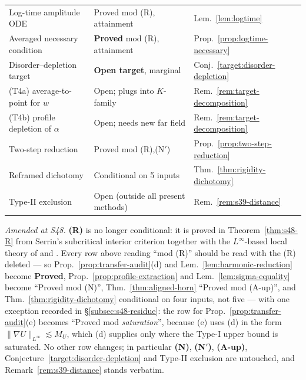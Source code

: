 \documentclass[11pt]{article}
\theoremstyle{definition}
\theoremstyle{remark}
\begin{document}
\begin{center}
\begin{tabular}{lll}
Log-time amplitude ODE & Proved mod (R), attainment & Lem.~\ref{lem:logtime} \\
Averaged necessary condition & \textbf{Proved} mod (R), attainment & Prop.~\ref{prop:logtime-necessary} \\
Disorder--depletion target & \textbf{Open target}, marginal & Conj.~\ref{target:disorder-depletion} \\
\quad (T4a) average-to-point for $w$ & Open; plugs into $K$-family & Rem.~\ref{rem:target-decomposition} \\
\quad (T4b) profile depletion of $\alpha$ & Open; needs new far field & Rem.~\ref{rem:target-decomposition} \\
Two-step reduction & Proved mod (R),(N$'$) & Prop.~\ref{prop:two-step-reduction} \\
Reframed dichotomy & Conditional on 5 inputs & Thm.~\ref{thm:rigidity-dichotomy} \\
Type-II exclusion & Open (outside all present methods) & Rem.~\ref{rem:s39-distance} \\
\hline
\end{tabular}
\end{center}

\noindent\emph{Amended at S48.} \textbf{(R)} is no longer conditional: it is
proved in Theorem~\ref{thm:s48-R} from Serrin's subcritical interior
criterion \cite{Serrin1962,ChenGaldiPoggiSchikorra2026} together with the
$L^\infty$-based local theory of \cite[\S4]{KNSS2009} and
\cite[Thm.~2.4]{SereginSverak2009}. Every row above reading ``mod (R)''
should be read with the (R) deleted --- so
Prop.~\ref{prop:transfer-audit}(d) and Lem.~\ref{lem:harmonic-reduction}
become \textbf{Proved}, Prop.~\ref{prop:profile-extraction} and
Lem.~\ref{lem:sigma-equality} become ``Proved mod (N)'',
Thm.~\ref{thm:aligned-horn} ``Proved mod (A-up)'', and
Thm.~\ref{thm:rigidity-dichotomy} conditional on four inputs, not five ---
with one exception recorded in \S\ref{subsec:s48-residue}: the row for
Prop.~\ref{prop:transfer-audit}(e) becomes ``Proved mod \emph{saturation}'',
because (e) uses (d) in the form $\|\nabla U\|_{L^\infty}\lesssim M_U$, which
(d) supplies only where the Type-I upper bound is saturated. No other row
changes; in particular \textbf{(N)}, \textbf{(N$'$)}, \textbf{(A-up)},
Conjecture~\ref{target:disorder-depletion} and Type-II exclusion are
untouched, and Remark~\ref{rem:s39-distance} stands verbatim.
\end{document}
